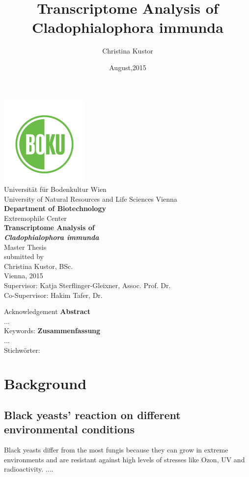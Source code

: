 \documentclass[11pt, a4paper]{report}
\title{Transcriptome Analysis of Cladophialophora immunda}
\author{Christina Kustor}
\date{August,2015}
\begin{document}
\newpage
\begin{center}
\includegraphics{boku_logo}\\
\smallskip
\large {Universit\"at f\"ur Bodenkultur Wien\\
University of Natural Resources and Life Sciences Vienna\\
\bigskip \bigskip \bigskip
\textbf{Department of Biotechnology}\\
Extremophile Center}\\
\bigskip \bigskip
\LARGE\textbf{Transcriptome Analysis of\\
\textit{Cladophialophora immunda}}\\
\bigskip
\large {Master Thesis\\
\bigskip \bigskip \bigskip
submitted by\\
Christina Kustor, BSc.\\
Vienna, 2015\\
\bigskip \bigskip \bigskip \bigskip
Supervisor: Katja Sterflinger-Gleixner, Assoc. Prof. Dr.\\
Co-Supervisor: Hakim Tafer, Dr.\\}
\end{center}

\newpage
Acknowledgement
\newpage
{}
\large \textbf{Abstract}\\
... \\
Keywords: 
\newpage
\large \textbf{Zusammenfassung}\\
...\\
Stichw\"orter: 
\newpage
\tableofcontents
\newpage
\setcounter{chapter}{1}
\setcounter{figure}{0}

\chapter*{Background} 
\section{Black yeasts' reaction on different environmental conditions} 
Black yeasts differ from the most fungis because they can grow in extreme environments and are resistant against high levels of stresses like Ozon, UV and radioactivity. \cite{Gostincar2010} 
....
\end{document}
